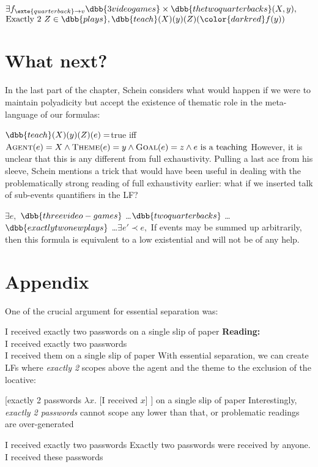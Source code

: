 \ex
$\exists f_{\exte{quarterback}\rightarrow v}\dbb{3 video games}\times \dbb{the two quarterbacks} (X, y),$\\
$\text{Exactly 2 } Z\in \dbb{plays},  \dbb{teach}(X)(y)(Z)({\color{darkred} f(y)})$
\xe
%

\section{What next?}

In the last part of the chapter, Schein considers what would happen if we were to maintain polyadicity but accept the existence of thematic role in the meta-language of our formulas:

\ex
$\dbb{teach}(X)(y)(Z)(e)=$true iff $\textsc{Agent}(e) = X \wedge \textsc{Theme}(e) = y \wedge \textsc{Goal}(e) = z\wedge e\text{ is a teaching}  $
\xe
%
However, it is unclear that this is any different from full exhaustivity. Pulling a last ace from his sleeve, Schein mentions a trick that would have been useful in dealing with the problematically strong reading of full exhaustivity earlier: what if we inserted talk of sub-events quantifiers in the LF?


\ex
$\exists e,$ $\dbb{three video-games}$ \ldots $\dbb{two quarterbacks}$ \ldots $\dbb{exactly two new plays}$ \ldots $\exists e'\prec e,$ 
\xe
%
If events may be summed up arbitrarily, then this formula is equivalent to a low existential and will not be of any help.

\section*{Appendix}

One of the crucial argument for essential separation was:

\pex
\a I received exactly two passwords on a single slip of paper
\a \textbf{Reading:}\\
I received exactly two passwords\\
I received them on a single slip of paper
\xe
%
With essential separation, we can create LFs where \emph{exactly 2} scopes above the agent and the theme to the exclusion of the locative:

\ex{}
[exactly 2 passwords $\lambda x.$ [I received $x$] ] on a single slip of paper
\xe
%
Interestingly, \emph{exactly 2 passwords} cannot scope any lower than that, or problematic readings are over-generated

\pex
\a 
I received exactly two passwords
\a 
Exactly two passwords were received by anyone.\\
I received these passwords
\xe
%









